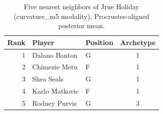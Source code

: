 \begin{table}[htbp]
  \centering\small
  \begin{tabular}{rllc}
    \toprule
    Rank & Player & Position & Archetype \\
    \midrule
    1 & Dalano Banton & G & 1 \\
    2 & Chimezie Metu & F & 1 \\
    3 & Shea Seals & G & 1 \\
    4 & Karlo Matkovic & F & 1 \\
    5 & Rodney Purvis & G & 3 \\
    \bottomrule
  \end{tabular}
  \caption{Five nearest neighbors of Jrue Holiday (curvature_m5 modality), Procrustes-aligned posterior mean.}
  \label{tab:Jrue_Holiday_neighbors_curvature_m5}
\end{table}

